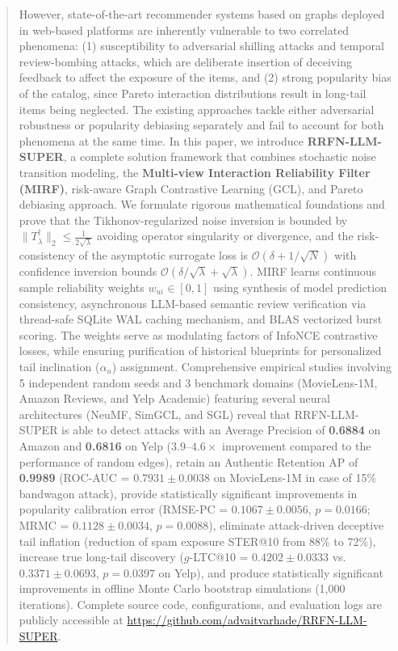 \documentclass[10pt,journal]{IEEEtran}
\begin{document}
\begin{abstract}
However, state-of-the-art recommender systems based on graphs deployed in web-based platforms are inherently vulnerable to two correlated phenomena: (1) susceptibility to adversarial shilling attacks and temporal review-bombing attacks, which are deliberate insertion of deceiving feedback to affect the exposure of the items, and (2) strong popularity bias of the catalog, since Pareto interaction distributions result in long-tail items being neglected. The existing approaches tackle either adversarial robustness or popularity debiasing separately and fail to account for both phenomena at the same time. In this paper, we introduce \textbf{RRFN-LLM-SUPER}, a complete solution framework that combines stochastic noise transition modeling, the \textbf{Multi-view Interaction Reliability Filter (MIRF)}, risk-aware Graph Contrastive Learning (GCL), and Pareto debiasing approach. We formulate rigorous mathematical foundations and prove that the Tikhonov-regularized noise inversion is bounded by $\|T^{\dagger}_\lambda\|_2 \le \frac{1}{2\sqrt{\lambda}}$ avoiding operator singularity or divergence, and the risk-consistency of the asymptotic surrogate loss is $\mathcal{O}(\delta + 1/\sqrt{N})$ with confidence inversion bounds $\mathcal{O}(\delta/\sqrt{\lambda} + \sqrt{\lambda})$. MIRF learns continuous sample reliability weights $w_{ui} \in [0, 1]$ using synthesis of model prediction consistency, asynchronous LLM-based semantic review verification via thread-safe SQLite WAL caching mechanism, and BLAS vectorized burst scoring. The weights serve as modulating factors of InfoNCE contrastive losses, while ensuring purification of historical blueprints for personalized tail inclination ($\alpha_u$) assignment. Comprehensive empirical studies involving 5 independent random seeds and 3 benchmark domains (MovieLens-1M, Amazon Reviews, and Yelp Academic) featuring several neural architectures (NeuMF, SimGCL, and SGL) reveal that RRFN-LLM-SUPER is able to detect attacks with an Average Precision of \textbf{0.6884} on Amazon and \textbf{0.6816} on Yelp ($3.9$--$4.6\times$ improvement compared to the performance of random edges), retain an Authentic Retention AP of \textbf{0.9989} (ROC-AUC = $\mathbf{0.7931 \pm 0.0038}$ on MovieLens-1M in case of 15\% bandwagon attack), provide statistically significant improvements in popularity calibration error (RMSE-PC = $\mathbf{0.1067 \pm 0.0056}$, $p = 0.0166$; MRMC = $\mathbf{0.1128 \pm 0.0034}$, $p = 0.0088$), eliminate attack-driven deceptive tail inflation (reduction of spam exposure STER@10 from 88\% to 72\%), increase true long-tail discovery ($g$-LTC@10 = $0.4202 \pm 0.0333$ vs. $0.3371 \pm 0.0693$, $p = 0.0397$ on Yelp), and produce statistically significant improvements in offline Monte Carlo bootstrap simulations (1,000 iterations). Complete source code, configurations, and evaluation logs are publicly accessible at \url{https://github.com/advaitvarhade/RRFN-LLM-SUPER}.
\end{abstract}
\end{document}
